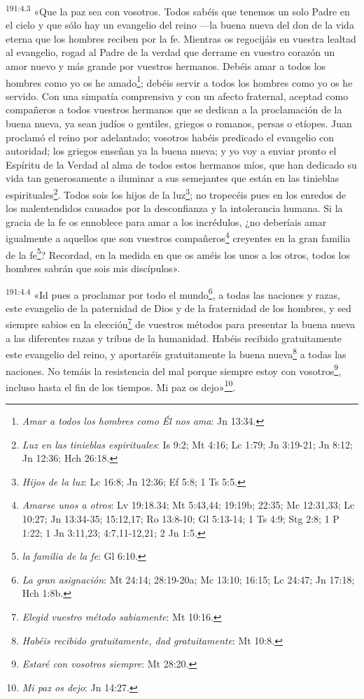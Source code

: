 \par 
\textsuperscript{191:4.3} «Que la paz sea con vosotros. Todos sabéis que tenemos un solo Padre en el cielo y que sólo hay un evangelio del reino ---la buena nueva del don de la vida eterna que los hombres reciben por la fe. Mientras os regocijáis en vuestra lealtad al evangelio, rogad al Padre de la verdad que derrame en vuestro corazón un amor nuevo y más grande por vuestros hermanos. Debéis amar a todos los hombres como yo os he amado\footnote{\textit{Amar a todos los hombres como Él nos ama}: Jn 13:34.}; debéis servir a todos los hombres como yo os he servido. Con una simpatía comprensiva y con un afecto fraternal, aceptad como compañeros a todos vuestros hermanos que se dedican a la proclamación de la buena nueva, ya sean judíos o gentiles, griegos o romanos, persas o etíopes. Juan proclamó el reino por adelantado; vosotros habéis predicado el evangelio con autoridad; los griegos enseñan ya la buena nueva; y yo voy a enviar pronto el Espíritu de la Verdad al alma de todos estos hermanos míos, que han dedicado su vida tan generosamente a iluminar a sus semejantes que están en las tinieblas espirituales\footnote{\textit{Luz en las tinieblas espirituales}: Is 9:2; Mt 4:16; Lc 1:79; Jn 3:19-21; Jn 8:12; Jn 12:36; Hch 26:18.}. Todos sois los hijos de la luz\footnote{\textit{Hijos de la luz}: Lc 16:8; Jn 12:36; Ef 5:8; 1 Ts 5:5.}; no tropecéis pues en los enredos de los malentendidos causados por la desconfianza y la intolerancia humana. Si la gracia de la fe os ennoblece para amar a los incrédulos, ¿no deberíais amar igualmente a aquellos que son vuestros compañeros\footnote{\textit{Amarse unos a otros}: Lv 19:18.34; Mt 5:43,44; 19:19b; 22:35; Mc 12:31,33; Lc 10:27; Jn 13:34-35; 15:12,17; Ro 13:8-10; Gl 5:13-14; 1 Ts 4:9; Stg 2:8; 1 P 1:22; 1 Jn 3:11,23; 4:7,11-12,21; 2 Jn 1:5.} creyentes en la gran familia de la fe\footnote{\textit{la familia de la fe}: Gl 6:10.}? Recordad, en la medida en que os améis los unos a los otros, todos los hombres sabrán que sois mis discípulos».

\par 
\textsuperscript{191:4.4} «Id pues a proclamar por todo el mundo\footnote{\textit{La gran asignación}: Mt 24:14; 28:19-20a; Mc 13:10; 16:15; Lc 24:47; Jn 17:18; Hch 1:8b.}, a todas las naciones y razas, este evangelio de la paternidad de Dios y de la fraternidad de los hombres, y sed siempre sabios en la elección\footnote{\textit{Elegid vuestro método sabiamente}: Mt 10:16.} de vuestros métodos para presentar la buena nueva a las diferentes razas y tribus de la humanidad. Habéis recibido gratuitamente este evangelio del reino, y aportaréis gratuitamente la buena nueva\footnote{\textit{Habéis recibido gratuitamente, dad gratuitamente}: Mt 10:8.} a todas las naciones. No temáis la resistencia del mal porque siempre estoy con vosotros\footnote{\textit{Estaré con vosotros siempre}: Mt 28:20.}, incluso hasta el fin de los tiempos. Mi paz os dejo»\footnote{\textit{Mi paz os dejo}: Jn 14:27.}.

